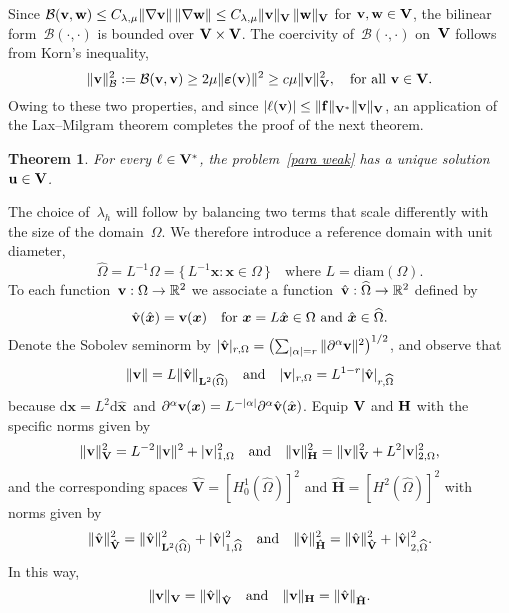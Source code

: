 \documentclass[11pt]{article}
\newcommand{\calB}{\mathcal{B}}
\newcommand{\vf}{{\bf f}}
\newcommand{\vu}{{\bf u}}
\newcommand{\vv}{{\bf v}}
\newcommand{\vV}{{\bf V}}
\newcommand{\vH}{{\bf H}}
\newcommand{\vVhat}{\mathbf{\hat V}}
\newcommand{\vHhat}{\mathbf{\hat H}}
\newcommand{\vw}{{\bf w}}
\newcommand{\bsx}{{\boldsymbol{x}}}
\numberwithin{equation}{section}
\newcommand{\veps}{{\boldsymbol{\varepsilon}}}
\newcommand{\ud}{\mathrm{d}}
\newcommand{\diam}{\mathrm{diam}}
\newtheorem{theorem}{Theorem}[section]
\begin{document}
Since $\calB(\vv,\vw) \le C_{\lambda,\mu}\|\nabla \vv\|\,\|\nabla \vw\|
\le C_{\lambda,\mu}\| \vv\|_{\vV}\,\|\vw\|_{\vV}$ for $\vv,\vw \in \vV$, the bilinear 
form~$\calB(\cdot,\cdot)$ is bounded over $\vV \times \vV$. The coercivity of~$\calB(\cdot,\cdot)$ 
on~$\vV$ follows from Korn's inequality,
\begin{equation}\label{eq: coer B}
\|\vv\|_\calB^2:=\calB(\vv,\vv)\ge2\mu\|\veps(\vv)\|^2\ge c\mu\|\vv\|_{\vV}^2,
\quad\text{for all $\vv\in\vV$.}
\end{equation}
Owing to these two properties, and since $|\ell(\vv)|
\le \|\vf\|_{\vV^*}\|\vv\|_{\vV}$, an application of
the Lax--Milgram theorem completes the proof of the next theorem.   

\begin{theorem}\label{thm: unique solution}
For every $\ell\in \vV^*$, the problem~\eqref{para weak} has a unique
solution~$\vu\in\vV$.
\end{theorem}

The choice of~$\lambda_h$ will follow by balancing two terms that scale
differently with the size of the domain~$\Omega$.  We therefore introduce a
reference domain with unit diameter,
\[
\widehat\Omega=L^{-1}\Omega=\{\,L^{-1}\bsx:\bsx\in\Omega\,\}
\quad\text{where $L=\diam(\Omega)$.}
\]
To each function~$\vv:\Omega\to\mathbb{R}^2$ we associate a
function~$\hat\vv:\widehat\Omega\to\mathbb{R}^2$ defined by
\[
\hat\vv(\hat\bsx)=\vv(\bsx)
    \quad\text{for $\bsx=L\hat\bsx\in\Omega$ and $\hat\bsx\in\widehat\Omega$.}
\]
Denote the Sobolev seminorm by $|\hat\vv|_{r,\Omega}=\bigl(\sum_{|\alpha|=r}
\|\partial^\alpha\vv\|^2\bigr)^{1/2}$, and observe that
\[
\|\vv\|=L\|\hat\vv\|_{\mathbf{L}^2(\widehat\Omega)}
\quad\text{and}\quad
|\vv|_{r,\Omega}=L^{1-r}|\hat\vv|_{r,\widehat\Omega}
\]
because $\ud\bsx=L^2\ud\hat\bsx$~and
$\partial^\alpha\vv(\bsx)=L^{-|\alpha|}\partial^\alpha\hat\vv(\hat\bsx)$.
Equip $\vV$ and $\vH$ with the specific norms given by
\begin{equation}\label{eq: V H norms}
\|\vv\|_{\vV}^2=L^{-2}\|\vv\|^2+|\vv|_{1,\Omega}^2
\quad\text{and}\quad
\|\vv\|_{\vH}^2=\|\vv\|_{\vV}^2+L^2|\vv|_{2,\Omega}^2,
\end{equation}
and the corresponding spaces
$\vVhat=[H^1_0(\widehat\Omega)]^2$ and $\vHhat=[H^2(\widehat\Omega)]^2$ with
norms given by
\[
\|\hat\vv\|_{\vVhat}^2=\|\hat\vv\|_{\mathbf{L}^2(\widehat\Omega)}^2
    +|\hat\vv|_{1,\widehat\Omega}^2
\quad\text{and}\quad
\|\hat\vv\|_{\vHhat}^2=\|\hat\vv\|_{\vVhat}^2
    +|\hat\vv|_{2,\widehat\Omega}^2.
\]
In this way,
\[
\|\vv\|_{\vV}=\|\hat\vv\|_{\vVhat}
\quad\text{and}\quad
\|\vv\|_{\mathbf{H}}=\|\hat\vv\|_{\vHhat}.
\]
\end{document}
